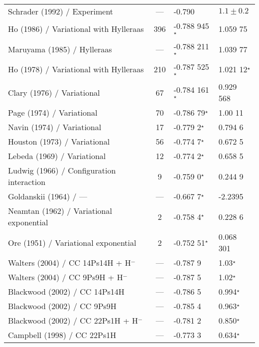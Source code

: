\documentclass[Dissertation.tex]{subfiles}
\begin{document}
{\begin{center}
\begin{longtable}{l c l l}
	Schrader (1992) \cite{Schrader1992} / Experiment & --- & -0.790 & $1.1 \pm 0.2$ \\*
	Ho (1986) \cite{Ho1986} / Variational with Hylleraas & 396 & -0.788 945$^\star$ & 1.059 75 \\*
	Maruyama (1985) \cite{Maruyama1985,Saito2003a} / Hylleraas & --- & -0.788 211$^\star$ & 1.039 77 \\*
	Ho (1978) \cite{Ho1978} / Variational with Hylleraas & 210 & -0.787 525$^\star$ & 1.021 12$^\star$ \\*
	Clary (1976) \cite{Clary1976} / Variational & 67 & -0.784 161$^\star$ & 0.929 568 \\*
	Page (1974) \cite{Page1974} / Variational & 70 & -0.786 79$^\star$ & 1.00 11 \\*
	Navin (1974) \cite{Navin1974} / Variational & 17 & -0.779 2$^\star$ & 0.794 6 \\*
	Houston (1973) \cite{Houston1973} / Variational & 56 & -0.774 7$^\star$ & 0.672 5 \\*
	Lebeda (1969) \cite{Lebeda1969} / Variational & 12 & -0.774 2$^\star$ & 0.658 5 \\*
	Ludwig (1966) \cite{Ludwig1966} / Configuration interaction & 9 & -0.759 0$^\star$ & 0.244 9 \\*
	Goldanskii (1964) \cite{Goldanskii1964,Clary1976} / --- & --- & -0.667 7$^\star$ & -2.2395 \\*
	Neamtan (1962) \cite{Neamtan1962} / Variational exponential & 2 & -0.758 4$^\star$ & 0.228 6 \\*
	Ore (1951) \cite{Ore1951} / Variational exponential & 2 & -0.752 51$^\star$ & 0.068 301 \\*
	Walters (2004) \cite{Walters2004} / CC 14Ps14H + H$^-$ & --- & -0.787 9 & 1.03$^\star$\\*
	Walters (2004) \cite{Walters2004} / CC 9Ps9H + H$^-$ & --- & -0.787 5 & 1.02$^\star$\\*
	Blackwood (2002) \cite{Blackwood2002} / CC 14Ps14H & --- & -0.786 5  & 0.994$^\star$ \\*
	Blackwood (2002) \cite{Blackwood2002} / CC 9Ps9H & --- & -0.785 4 & 0.963$^\star$ \\*
	Blackwood (2002) \cite{Blackwood2002b} / CC 22Ps1H + H$^-$ & --- & -0.781 2 & 0.850$^\star$ \\*
	Campbell (1998) \cite{Campbell1998} / CC 22Ps1H & --- & -0.773 3 & 0.634$^\star$ \\*
	\bottomrule
	\end{longtable}
	\end{center}

}
\end{document}
